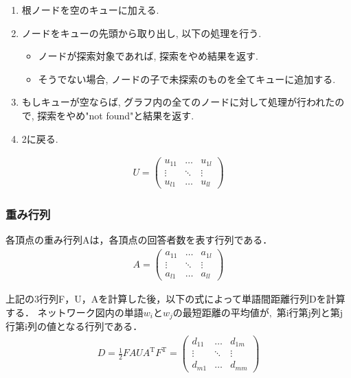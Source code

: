 \documentclass[syuuron]{kuee}
\begin{document}
				\begin{enumerate}
					\item 根ノードを空のキューに加える. 
					\item ノードをキューの先頭から取り出し, 以下の処理を行う. 
						\begin{itemize}
							\item ノードが探索対象であれば, 探索をやめ結果を返す. 
							\item そうでない場合, ノードの子で未探索のものを全てキューに追加する. 
						\end{itemize}
					\item もしキューが空ならば, グラフ内の全てのノードに対して処理が行われたので, 探索をやめ"not found"と結果を返す. 
					\item 2に戻る. 
				\end{enumerate}
				
				\begin{eqnarray}
				 U = \left(
				    \begin{array}{cccc}
				    	u_{11} & \ldots & u_{1l} \\
				    	\vdots & \ddots & \vdots \\
				    	u_{l1} & \ldots & u_{ll}
					\end{array}
				 \right)
				\end{eqnarray}	
				
			\subsubsection{重み行列}
				各頂点の重み行列Aは，各頂点の回答者数を表す行列である．
				\begin{eqnarray}
				 A = \left(
				    \begin{array}{cccc}
				    	a_{11} & \ldots & a_{1l} \\
				    	\vdots & \ddots & \vdots \\
				    	a_{l1} & \ldots & a_{ll}
					\end{array}
				 \right)
				\end{eqnarray}	
				
			上記の3行列F，U，Aを計算した後，以下の式によって単語間距離行列Dを計算する．
			$ネットワーク図内の単語w_iとw_jの最短距離の平均値が, $
			第i行第j列と第j行第i列の値となる行列である．
			\begin{eqnarray}
			 D = \frac{1}{2} FAUA^{\mathrm{T}}F^{\mathrm{T}}
			   = \left(
			    \begin{array}{cccc}
			    	d_{11} & \ldots & d_{1m} \\
			    	\vdots & \ddots & \vdots \\
			    	d_{m1} & \ldots & d_{mm}
				\end{array}
			 \right)
			\end{eqnarray}	
			
\end{document}
